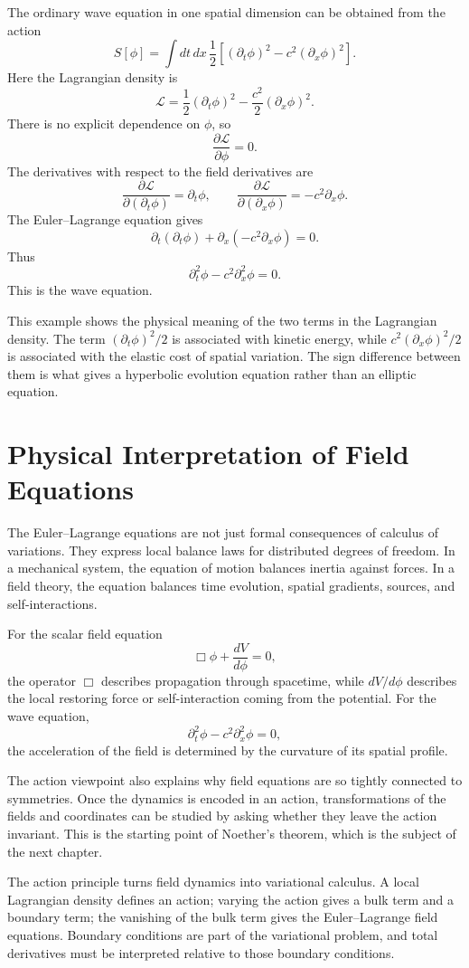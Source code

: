 The ordinary wave equation in one spatial dimension can be obtained from the
action
\[
    S[\phi]=\int dt\,dx\,
    \frac{1}{2}\left[(\partial_t\phi)^2-c^2(\partial_x\phi)^2\right].
\]
Here the Lagrangian density is
\[
    \mathcal{L}=\frac{1}{2}(\partial_t\phi)^2
    -\frac{c^2}{2}(\partial_x\phi)^2.
\]
There is no explicit dependence on \(\phi\), so
\[
    \frac{\partial\mathcal{L}}{\partial\phi}=0.
\]
The derivatives with respect to the field derivatives are
\[
    \frac{\partial\mathcal{L}}{\partial(\partial_t\phi)}=\partial_t\phi,
    \qquad
    \frac{\partial\mathcal{L}}{\partial(\partial_x\phi)}=-c^2\partial_x\phi.
\]
The Euler--Lagrange equation gives
\[
    \partial_t(\partial_t\phi)+\partial_x(-c^2\partial_x\phi)=0.
\]
Thus
\[
    \partial_t^2\phi-c^2\partial_x^2\phi=0.
\]
This is the wave equation.

This example shows the physical meaning of the two terms in the Lagrangian
density. The term \((\partial_t\phi)^2/2\) is associated with kinetic energy,
while \(c^2(\partial_x\phi)^2/2\) is associated with the elastic cost of spatial
variation. The sign difference between them is what gives a hyperbolic evolution
equation rather than an elliptic equation.

\section{Physical Interpretation of Field Equations}

The Euler--Lagrange equations are not just formal consequences of calculus of
variations. They express local balance laws for distributed degrees of freedom.
In a mechanical system, the equation of motion balances inertia against forces.
In a field theory, the equation balances time evolution, spatial gradients,
sources, and self-interactions.

For the scalar field equation
\[
    \Box\phi+\frac{dV}{d\phi}=0,
\]
the operator \(\Box\) describes propagation through spacetime, while
\(dV/d\phi\) describes the local restoring force or self-interaction coming from
the potential. For the wave equation,
\[
    \partial_t^2\phi-c^2\partial_x^2\phi=0,
\]
the acceleration of the field is determined by the curvature of its spatial
profile.

The action viewpoint also explains why field equations are so tightly connected
to symmetries. Once the dynamics is encoded in an action, transformations of the
fields and coordinates can be studied by asking whether they leave the action
invariant. This is the starting point of Noether's theorem, which is the subject
of the next chapter.

\begin{summarybox}
The action principle turns field dynamics into variational calculus. A local
Lagrangian density defines an action; varying the action gives a bulk term and a
boundary term; the vanishing of the bulk term gives the Euler--Lagrange field
equations. Boundary conditions are part of the variational problem, and total
derivatives must be interpreted relative to those boundary conditions.
\end{summarybox}
